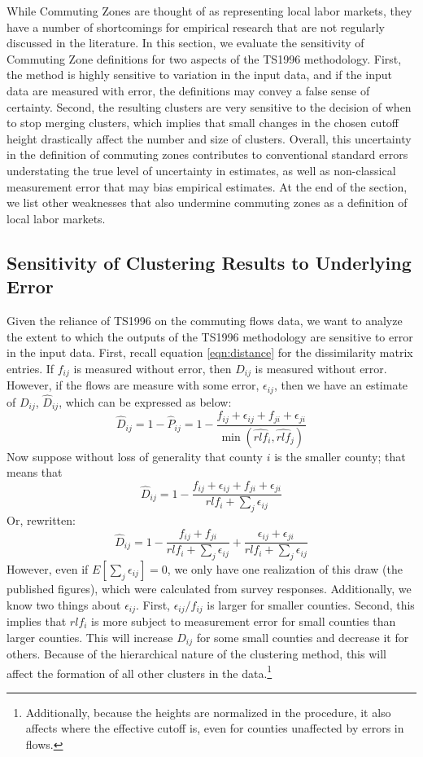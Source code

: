 While Commuting Zones are thought of as representing local labor markets, they have a number of shortcomings for empirical research that are not regularly discussed in the literature. In this section, we evaluate the sensitivity of Commuting Zone definitions for two aspects of the TS1996 methodology. First, the method is highly sensitive to variation in the input data, and if the input data are measured with error, the definitions may convey a false sense of certainty. Second, the resulting clusters are very sensitive to the decision of when to stop merging clusters, which implies that small changes in the chosen cutoff height drastically affect the number and size of clusters. Overall, this uncertainty in the definition of commuting zones contributes to conventional standard errors understating the true level of uncertainty in estimates, as well as non-classical measurement error that may bias empirical estimates. At the end of the section, we list other weaknesses that also undermine commuting zones as a definition of local labor markets.

\subsection{Sensitivity of Clustering Results to Underlying Error}
Given the reliance of TS1996 on the commuting flows data, we want to analyze the extent to which the outputs of the TS1996 methodology are sensitive to error in the input data. First, recall equation \ref{eqn:distance} for the dissimilarity matrix entries. If $f_{ij}$ is measured without error, then $D_{ij}$ is measured without error. However, if the flows are measure with some error, $\epsilon_{ij}$, then we have an estimate of $D_{ij}$, $\hat{D}_{ij}$, which can be expressed as below:
\begin{equation}
\hat{D}_{ij} = 1- \hat{P}_{ij} = 1- \frac{f_{ij}+\epsilon_{ij} + f_{ji} + \epsilon_{ji}}{\min(\hat{rlf}_i,\hat{rlf}_j)}
\end{equation}	
Now suppose without loss of generality that county $i$ is the smaller county; that means that 
\[
\hat{D}_{ij} =1- \frac{f_{ij}+\epsilon_{ij} + f_{ji} + \epsilon_{ji}}{ rlf_i + \sum_j \epsilon_{ij}}
\]
Or, rewritten:
\[
\hat{D}_{ij} =1- \frac{f_{ij} + f_{ji} }{rlf_i + \sum_j \epsilon_{ij}}+\frac{\epsilon_{ij} + \epsilon_{ji}}{ rlf_i + \sum_j \epsilon_{ij}}
\]
However, even if $E[\sum_j \epsilon_{ij}]=0$, we only have one realization of this draw (the published figures), which were calculated from survey responses. Additionally, we know two things about $\epsilon_{ij}$. First, $\epsilon_{ij} / f_{ij}$ is larger for smaller counties. Second, this implies that $rlf_i$ is 
more subject to measurement error for small counties than larger counties.
This will increase $D_{ij}$ for some small counties and decrease it for others. Because of the hierarchical nature of the clustering method, this will affect the formation of all other clusters in the data.\footnote{Additionally, because the heights are normalized in the procedure, it also affects where the effective cutoff is, even for counties unaffected by errors in flows.}

